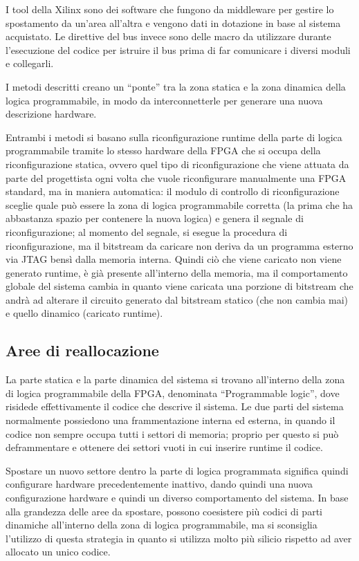 \documentclass[a4paper,titlepage]{book}
\begin{document}
I tool della Xilinx sono dei software che fungono da middleware per gestire lo spostamento da un'area all'altra e vengono dati in dotazione in base al sistema acquistato. Le direttive del bus invece sono delle macro da utilizzare durante l'esecuzione del codice per istruire il bus prima di far comunicare i diversi moduli e collegarli. 

I metodi descritti creano un ``ponte'' tra la zona statica e la zona dinamica della logica programmabile, in modo da interconnetterle per generare una nuova descrizione hardware.

Entrambi i metodi si basano sulla riconfigurazione runtime della parte di logica programmabile tramite lo stesso hardware della FPGA che si occupa della riconfigurazione statica, ovvero quel tipo di riconfigurazione che viene attuata da parte del progettista ogni volta che vuole riconfigurare manualmente una FPGA standard, ma in maniera automatica: il modulo di controllo di riconfigurazione sceglie quale può essere la zona di logica programmabile corretta (la prima che ha abbastanza spazio per contenere la nuova logica) e genera il segnale di riconfigurazione; al momento del segnale, si esegue la procedura di riconfigurazione, ma il bitstream da caricare non deriva da un programma esterno via JTAG bensì dalla memoria interna. Quindi ciò che viene caricato non viene generato runtime, è già presente all'interno della memoria, ma il comportamento globale del sistema cambia in quanto viene caricata una porzione di bitstream che andrà ad alterare il circuito generato dal bitstream statico (che non cambia mai) e quello dinamico (caricato runtime).

\subsection{Aree di reallocazione}

La parte statica e la parte dinamica del sistema si trovano all'interno della zona di logica programmabile della FPGA, denominata ``Programmable logic'', dove risidede effettivamente il codice che descrive il sistema. Le due parti del sistema normalmente possiedono una frammentazione interna ed esterna, in quando il codice non sempre occupa tutti i settori di memoria; proprio per questo si può deframmentare e ottenere dei settori vuoti in cui inserire runtime il codice.

Spostare un nuovo settore dentro la parte di logica programmata significa quindi configurare hardware precedentemente inattivo, dando quindi una nuova configurazione hardware e quindi un diverso comportamento del sistema. In base alla grandezza delle aree da spostare, possono coesistere più codici di parti dinamiche all'interno della zona di logica programmabile, ma si sconsiglia l'utilizzo di questa strategia in quanto si utilizza molto più silicio rispetto ad aver allocato un unico codice.
\end{document}
